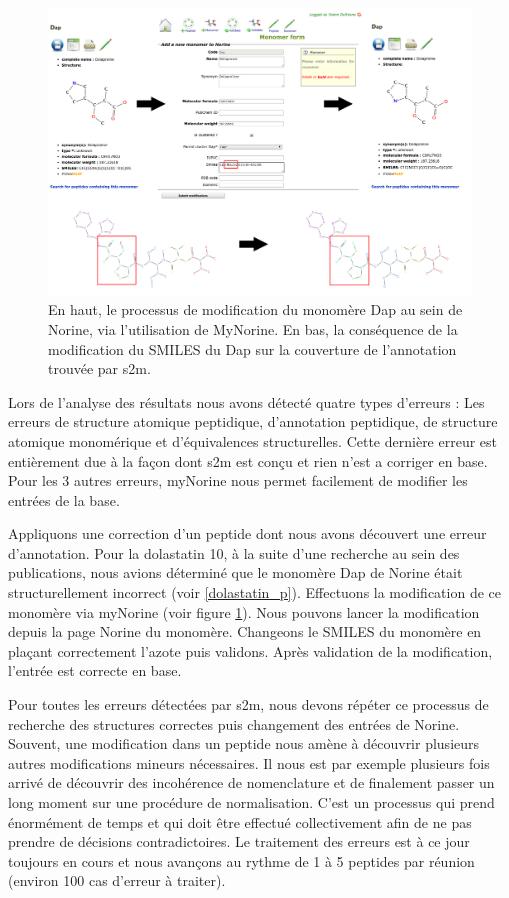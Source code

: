 \begin{figure}[h!]
  \begin{center}
    \includegraphics[width=450px]{Figures/contributions/dap_modif.png}
    \caption{\label{dap_modif}En haut, le processus de modification du monomère Dap au sein de Norine, via l'utilisation de MyNorine.
    En bas, la conséquence de la modification du SMILES du Dap sur la couverture de l'annotation trouvée par s2m.}
  \end{center}
\end{figure}

Lors de l'analyse des résultats nous avons détecté quatre types d'erreurs : Les erreurs de structure atomique peptidique, d'annotation peptidique, de structure atomique monomérique et d'équivalences structurelles.
Cette dernière erreur est entièrement due à la façon dont s2m est conçu et rien n'est a corriger en base.
Pour les 3 autres erreurs, myNorine nous permet facilement de modifier les entrées de la base.

Appliquons une correction d'un peptide dont nous avons découvert une erreur d'annotation.
Pour la dolastatin 10, à la suite d'une recherche au sein des publications, nous avions déterminé que le monomère Dap de Norine était structurellement incorrect (voir \ref{dolastatin_p}).
Effectuons la modification de ce monomère via myNorine (voir figure \ref{dap_modif}).
Nous pouvons lancer la modification depuis la page Norine du monomère.
Changeons le SMILES du monomère en plaçant correctement l'azote puis validons.
Après validation de la modification, l'entrée est correcte en base.

Pour toutes les erreurs détectées par s2m, nous devons répéter ce processus de recherche des structures correctes puis changement des entrées de Norine.
Souvent, une modification dans un peptide nous amène à découvrir plusieurs autres modifications mineurs nécessaires.
Il nous est par exemple plusieurs fois arrivé de découvrir des incohérence de nomenclature et de finalement passer un long moment sur une procédure de normalisation.
C'est un processus qui prend énormément de temps et qui doit être effectué collectivement afin de ne pas prendre de décisions contradictoires.
Le traitement des erreurs est à ce jour toujours en cours et nous avançons au rythme de 1 à 5 peptides par réunion (environ 100 cas d'erreur à traiter).


